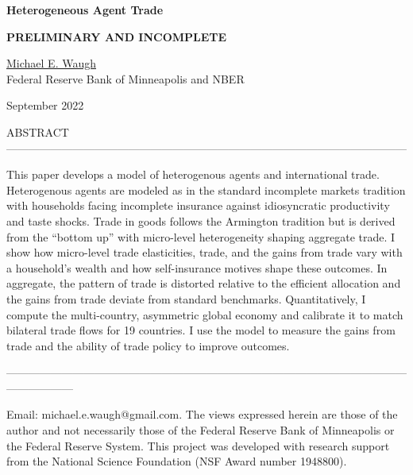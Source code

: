 \documentclass[12pt,pdftex]{article}
\begin{document}
\begin{onehalfspacing}

{\large \textbf{Heterogeneous Agent Trade}}

\vspace{0.5cm}

{\textbf{PRELIMINARY AND INCOMPLETE}}

\vspace{0.5cm}

\href{http://www.waugheconomics.com/}{Michael E. Waugh} \\ Federal Reserve Bank of Minneapolis and NBER

\vspace{0.5cm}

September 2022

\vspace{1.5cm}


\normalsize

ABSTRACT ------------------------------------------------------------------------------------------------------------

This paper develops a model of heterogenous agents and international trade. Heterogenous agents are modeled as in the standard incomplete markets tradition with households facing incomplete insurance against idiosyncratic productivity and taste shocks. Trade in goods follows the Armington tradition but is derived from the ``bottom up'' with micro-level heterogeneity shaping aggregate trade. I show how micro-level trade elasticities, trade, and the gains from trade vary with a household's wealth and how self-insurance motives shape these outcomes. In aggregate, the pattern of trade is distorted relative to the efficient allocation and the gains from trade deviate from standard benchmarks. Quantitatively, I compute the multi-country, asymmetric global economy and calibrate it to match bilateral trade flows for 19 countries. I use the model to measure the gains from trade and the ability of trade policy to improve outcomes.

------------------------------------------------------------------------------------------------------------------------------
%

\vspace{5.75cm}

\footnotesize Email: michael.e.waugh@gmail.com. The views expressed herein are those of the author and not necessarily those of the Federal
Reserve Bank of Minneapolis or the Federal Reserve System. This project was developed with research support from the National Science Foundation (NSF Award number 1948800).


\end{onehalfspacing}
\end{document}

